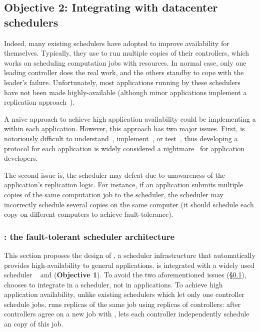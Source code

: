 \vspace{-.15in}\subsection{Objective 2: Integrating \falcon with datacenter 
schedulers}\label{sec:scheduler}\vspace{-.075in}

Indeed, many existing schedulers have adopted \paxos to improve availability 
for themselves. Typically, they use \paxos to run multiple copies of their 
controllers, which works on scheduling computation jobs with resources. In 
normal case, only one leading controller does the real work, and the others 
standby to cope with the leader's failure. Unfortunately, most applications 
running by these schedulers have not been made highly-available (although minor 
applications implement a replication 
approach~\cite{mapreduce,dolly:nsdi13}).

A naive approach to achieve high application availability could be implementing 
a \paxos within each application. However, this approach has two major issues. 
First, \paxos is notoriously difficult to 
understand~\cite{raft:usenix14,paxos:simple}, implement~\cite{paxos:practical, 
paxos:live}, or test~\cite{modist:nsdi09,demeter:sosp11}, thus developing a 
\paxos protocol for each application is widely considered a 
nightmare~\cite{modist:nsdi09,demeter:sosp11,paxos:live} for application 
developers.

The second issue is, the scheduler may defeat \paxos due to unawareness of the 
application's \paxos replication logic. For instance, if an application submits 
multiple copies of the same computation job to the scheduler, the scheduler may 
incorrectly schedule several copies on the same computer (it should schedule 
each copy on different computers to achieve \paxos fault-tolerance).

\vspace{-.15in}\subsubsection{\tripod: the fault-tolerant scheduler 
architecture} 
\label{sec:scheduler-arch}\vspace{-.075in}

This section proposes the design of \tripod, a scheduler infrastructure that 
automatically provides high-availability to general applications. \tripod 
is integrated with a widely used scheduler \mesos~\cite{mesos:nsdi11} and 
\falcon (\textbf{Objective 1}). To avoid the two aforementioned issues 
(\S\ref{sec:scheduler}), \tripod chooses 
to integrate \paxos in a scheduler, not in applications. To achieve high
application availability, unlike existing schedulers which let only one 
controller schedule jobs, \tripod runs replicas of the same job using replicas 
of controllers: after controllers agree on a new job with \falcon, \tripod lets 
each controller independently schedule an copy of this job.

